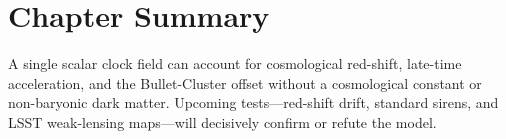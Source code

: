\section*{Chapter Summary}

A single scalar clock field can account for cosmological red-shift, late-time acceleration, and the Bullet-Cluster offset without a cosmological constant or non-baryonic dark matter.  
Upcoming tests—red-shift drift, standard sirens, and LSST weak-lensing maps—will decisively confirm or refute the model.
